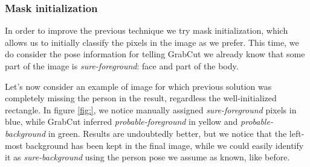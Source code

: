 \subsubsection{Mask initialization}
\label{subsec:masking-grabcut-mask}

In order to improve the previous technique we try mask initialization, which allows us to initially classify the pixels in the image as we prefer. This time, we do consider the pose information for telling GrabCut we already know that some part of the image is \textit{sure-foreground}: face and part of the body.

Let's now consider an example of image for which previous solution was completely missing the person in the result, regardless the well-initialized rectangle.
In figure \ref{fig:}, we notice manually assigned \textit{sure-foreground} pixels in blue, while GrabCut inferred \textit{probable-foreground} in yellow and \textit{probable-background} in green. Results are undoubtedly better, but we notice that the left-most background has been kept in the final image, while we could easily identify it as \textit{sure-background} using the person pose we assume as known, like before.


